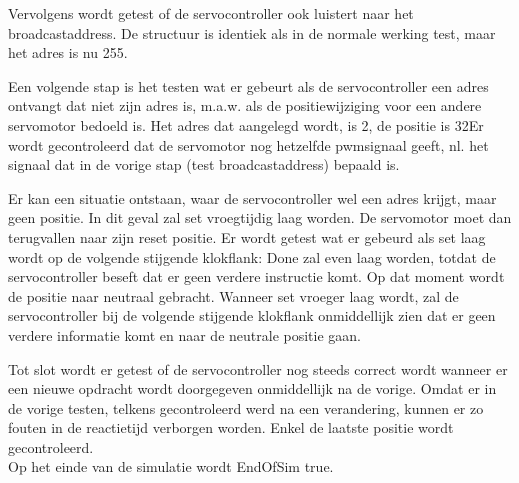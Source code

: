 
Vervolgens wordt getest of de servocontroller ook luistert naar het broadcastaddress. De structuur is identiek als in de normale werking test, maar het adres is nu 255.


Een volgende stap is het testen wat er gebeurt als de servocontroller een adres ontvangt dat niet zijn adres is, m.a.w. als de positiewijziging voor een andere servomotor bedoeld is. Het adres dat aangelegd wordt, is 2, de positie is 32\textdegree Er wordt gecontroleerd dat de servomotor nog hetzelfde \gls{pwm}signaal geeft, nl. het signaal dat in de vorige stap (test broadcastaddress) bepaald is.


Er kan een situatie ontstaan, waar de servocontroller wel een adres krijgt, maar geen positie. In dit geval zal set vroegtijdig laag worden. De servomotor moet dan terugvallen naar zijn reset positie. Er wordt getest wat er gebeurd als set laag wordt op de volgende stijgende klokflank: Done zal even laag worden, totdat de servocontroller beseft dat er geen verdere instructie komt. Op dat moment wordt de positie naar neutraal gebracht. Wanneer set vroeger laag wordt, zal de servocontroller bij de volgende stijgende klokflank onmiddellijk zien dat er geen verdere informatie komt en naar de neutrale positie gaan.


Tot slot wordt er getest of de servocontroller nog steeds correct wordt wanneer er een nieuwe opdracht wordt doorgegeven onmiddellijk na de vorige. Omdat er in de vorige testen, telkens gecontroleerd werd na een verandering, kunnen er zo fouten in de reactietijd verborgen worden. Enkel de laatste positie wordt gecontroleerd.\\
\noindent
Op het einde van de simulatie wordt EndOfSim true.

